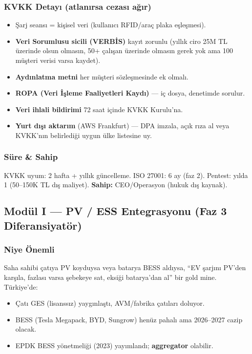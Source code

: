 \documentclass[11pt,a4paper]{article}
\begin{document}
\subsubsection{KVKK Detayı (atlanırsa cezası ağır)}

\begin{itemize}
    \item Şarj seansı = kişisel veri (kullanıcı RFID/araç plaka eşleşmesi).
    \item \textbf{Veri Sorumlusu sicili (VERBİS)} kayıt zorunlu (yıllık ciro 25M TL üzerinde olsun olmasın, 50+ çalışan üzerinde olmasın gerek yok ama 100 müşteri verisi varsa kaydet).
    \item \textbf{Aydınlatma metni} her müşteri sözleşmesinde ek olmalı.
    \item \textbf{ROPA (Veri İşleme Faaliyetleri Kaydı)} — iç dosya, denetimde sorulur.
    \item \textbf{Veri ihlali bildirimi} 72 saat içinde KVKK Kurulu'na.
    \item \textbf{Yurt dışı aktarım} (AWS Frankfurt) — DPA imzala, açık rıza al veya KVKK'nın belirlediği uygun ülke listesine uy.
\end{itemize}

\subsubsection{Süre \& Sahip}
KVKK uyum: 2 hafta + yıllık güncelleme. ISO 27001: 6 ay (faz 2). Pentest: yılda 1 (50--150K TL dış maliyet). \textbf{Sahip:} CEO/Operasyon (hukuk dış kaynak).

\subsection{Modül I — PV / ESS Entegrasyonu (Faz 3 Diferansiyatör)}

\subsubsection{Niye Önemli}
Saha sahibi çatıya PV koyduysa veya batarya BESS aldıysa, ``EV şarjını PV'den karşıla, fazlası varsa şebekeye sat, eksiği batarya'dan al'' bir gold mine. Türkiye'de:
\begin{itemize}
    \item Çatı GES (lisanssız) yaygınlaştı, AVM/fabrika çatıları doluyor.
    \item BESS (Tesla Megapack, BYD, Sungrow) henüz pahalı ama 2026--2027 cazip olacak.
    \item EPDK BESS yönetmeliği (2023) yayımlandı; \textbf{aggregator} olabilir.
\end{itemize}
\end{document}
